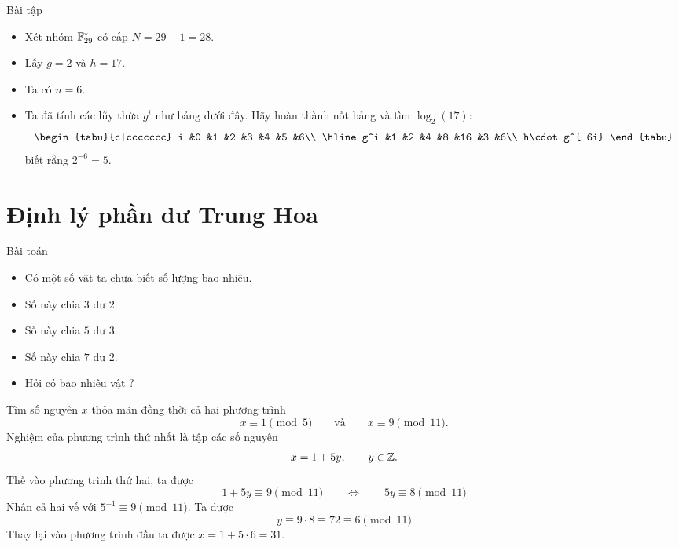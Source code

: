 \begin{frame}{Bài tập}
	\begin{itemize}
		\item<+-> Xét nhóm $\mathbb{F}_{29}^*$ có cấp $N = 29-1=28$.
		\item<+-> Lấy $g=2$ và $h = 17$.
		\item<+-> Ta có $n = 6.$
		\item<+-> Ta đã tính các lũy thừa $g^i$ như bảng dưới đây. Hãy hoàn thành nốt bảng và tìm $\log_2(17)$:
$$		\begin{tabu}{c|ccccccc}
		i &0  &1  &2  &3  &4  &5  &6\\
		\hline 
		 g^i &1  &2  &4  &8  &16  &3  &6\\
		 h\cdot g^{-6i}
		\end{tabu} 	  
$$	
biết rằng $2^{-6} = 5$.
\end{itemize}
\end{frame}

\section{Định lý phần dư Trung Hoa}
\begin{frame}{Bài toán}
	\begin{itemize}
		\item<+-> Có một số vật ta chưa biết số lượng bao nhiêu.
		\item<+-> Số này chia $3$ dư $2$.
		\item<+-> Số này chia $5$ dư $3$.
		\item<+-> Số này chia $7$ dư $2$.
		\item<+-> Hỏi có bao nhiêu vật ?    
	\end{itemize}
\end{frame}

\begin{frame}%
	\begin{xmpl}
		Tìm số nguyên $x$ thỏa mãn đồng thời cả hai phương trình
		\[
			x \equiv 1 \pmod{5} \qquad \text{và} \qquad x\equiv 9 \pmod{11}.
		\]
Nghiệm của phương trình thứ nhất là tập các số nguyên 
\[
	x = 1 + 5y,\qquad y \in \mathbb{Z}.
\]
Thế vào phương trình thứ hai, ta được 
\[
1 + 5y \equiv 9\pmod{11}\qquad  \Leftrightarrow\qquad  5y \equiv 8\pmod{11}  
\]
Nhân cả hai vế với $5^{-1} \equiv 9 \pmod{11}$. Ta được $$y \equiv 9\cdot 8 \equiv 72 \equiv 6 \pmod{11} $$ 
Thay lại vào phương trình đầu ta được 
$
x = 1 + 5 \cdot 6 = 31.
$
	\end{xmpl}	
\end{frame}

